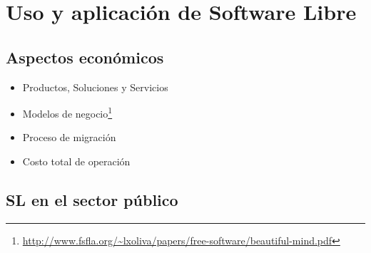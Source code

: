 
\section{Uso y aplicación de Software Libre}

\subsection{Aspectos económicos}
\begin{itemize}
	\item Productos, Soluciones y Servicios
	\item Modelos de negocio\footnote{\url{http://www.fsfla.org/~lxoliva/papers/free-software/beautiful-mind.pdf}
} 
	\item Proceso de migración
	\item Costo total de operación
\end{itemize}
\subsection{SL en el sector público}
\label{sub:SLenelsectorpúblico}
